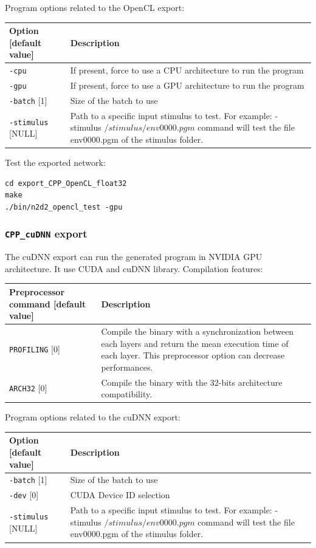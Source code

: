 \documentclass[a4paper,11pt,oneside]{article}
\begin{document}
Program options related to the OpenCL export:
\begin{center}
 \begin{tabular}{| p{5cm} | p{10cm} | }
 \hline
 Option [default value] & Description\\
 \hline\hline
  \lstinline!-cpu! & If present, force to use a CPU architecture to run
  the program \\
  \lstinline!-gpu! & If present, force to use a GPU architecture to run
  the program \\
  \lstinline!-batch! [1] & Size of the batch to use \\
  \lstinline!-stimulus! [NULL] & Path to a specific input stimulus to test.
  For example: -stimulus ${/stimulus/env0000.pgm}$ command will test the file
  env0000.pgm  of the stimulus folder.\\
 \hline
\end{tabular}
\end{center}

Test the exported network:
\begin{lstlisting}
cd export_CPP_OpenCL_float32
make
./bin/n2d2_opencl_test -gpu
\end{lstlisting}

\subsubsection{\texorpdfstring{%
\lstinline[basicstyle=\ttfamily\bfseries]!CPP_cuDNN! export}{CPP\_cuDNN export}}
The cuDNN export can run the generated program in NVIDIA GPU architecture.
It use CUDA and cuDNN library.
Compilation features:
\begin{center}
 \begin{tabular}{| p{7cm} | p{8cm} | }
 \hline
 Preprocessor command [default value] & Description\\
 \hline\hline
  \lstinline!PROFILING! [0] & Compile the binary with a synchronization
  between each layers and return the mean execution time of each layer.
  This preprocessor option can decrease performances.\\
  \lstinline!ARCH32! [0] & Compile the binary with the 32-bits architecture
   compatibility.\\
 \hline
\end{tabular}
\end{center}

Program options related to the cuDNN export:
\begin{center}
 \begin{tabular}{| p{5cm} | p{10cm} | }
 \hline
 Option [default value] & Description\\
 \hline\hline
  \lstinline!-batch! [1] & Size of the batch to use \\
  \lstinline!-dev! [0] & CUDA Device ID selection  \\
  \lstinline!-stimulus! [NULL] & Path to a specific input stimulus to test.
  For example: -stimulus ${/stimulus/env0000.pgm}$ command will test the file
   env0000.pgm  of the stimulus folder.\\
 \hline
\end{tabular}
\end{center}
\end{document}
